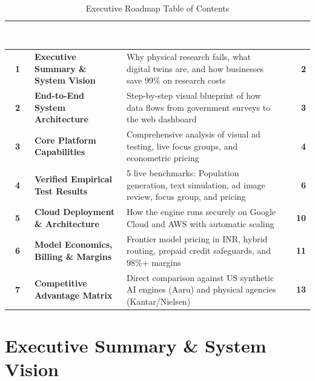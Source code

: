 \documentclass[11pt,a4paper]{article}
\begin{document}
\begin{table}[htbp]
\centering
\small
\setlength{\aboverulesep}{0pt}
\setlength{\belowrulesep}{0pt}
\setlength{\tabcolsep}{5pt}
\renewcommand{\arraystretch}{1.3}
\begin{tabularx}{\textwidth}{c l X r}
\toprule
\rowcolor{tblheaderblue}
\textcolor{white}{\textbf{Sec.}} & 
\textcolor{white}{\textbf{Report Section}} & 
\textcolor{white}{\textbf{Executive Focus \& Key Deliverables}} & 
\textcolor{white}{\textbf{Page}} \\
\midrule
\textbf{1} & \textbf{Executive Summary \& System Vision} & Why physical research fails, what digital twins are, and how businesses save 99\% on research costs & \textbf{2} \\
\textbf{2} & \textbf{End-to-End System Architecture} & Step-by-step visual blueprint of how data flows from government surveys to the web dashboard & \textbf{3} \\
\textbf{3} & \textbf{Core Platform Capabilities} & Comprehensive analysis of visual ad testing, live focus groups, and econometric pricing & \textbf{4} \\
\textbf{4} & \textbf{Verified Empirical Test Results} & 5 live benchmarks: Population generation, text simulation, ad image review, focus group, and pricing & \textbf{6} \\
\textbf{5} & \textbf{Cloud Deployment \& Architecture} & How the engine runs securely on Google Cloud and AWS with automatic scaling & \textbf{10} \\
\textbf{6} & \textbf{Model Economics, Billing \& Margins} & Frontier model pricing in INR, hybrid routing, prepaid credit safeguards, and 98\%+ margins & \textbf{11} \\
\textbf{7} & \textbf{Competitive Advantage Matrix} & Direct comparison against US synthetic AI engines (Aaru) and physical agencies (Kantar/Nielsen) & \textbf{13} \\
\bottomrule
\end{tabularx}
\caption{Executive Roadmap Table of Contents}
\label{tab:executive_contents}
\end{table}

\newpage

\section{Executive Summary \& System Vision}
\end{document}
